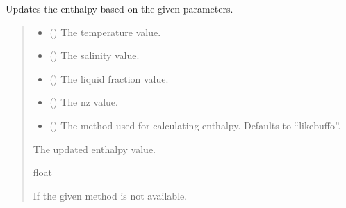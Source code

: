 \documentclass[a4paper,11pt,english,openany]{sphinxmanual}
\begin{document}
\begin{fulllineitems}
\label{\detokenize{api/spyice.update_physical_values:spyice.update_physical_values.update_enthalpy}}
\pysigstartsignatures
{}
\pysigstopsignatures
\sphinxAtStartPar
Updates the enthalpy based on the given parameters.
\begin{quote}\begin{description}
\begin{itemize}
\item {} 
\sphinxAtStartPar
{} () \textendash{} The temperature value.

\item {} 
\sphinxAtStartPar
{} () \textendash{} The salinity value.

\item {} 
\sphinxAtStartPar
{} () \textendash{} The liquid fraction value.

\item {} 
\sphinxAtStartPar
{} () \textendash{} The nz value.

\item {} 
\sphinxAtStartPar
{} (\sphinxstyleliteralemphasis{\sphinxupquote{, }}) \textendash{} The method used for calculating enthalpy. Defaults to “likebuffo”.

\end{itemize}

\sphinxAtStartPar
The updated enthalpy value.

\sphinxAtStartPar
float

\sphinxAtStartPar
{} \textendash{} If the given method is not available.

\end{description}\end{quote}

\end{fulllineitems}
\end{document}
